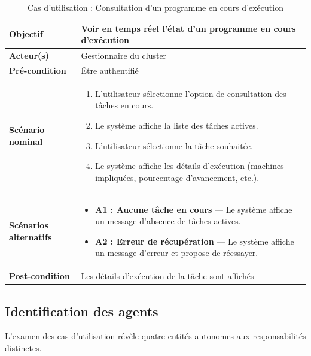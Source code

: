 \documentclass[12pt,a4paper]{report}
\begin{document}
\begin{table}[H]
\centering
\renewcommand{\arraystretch}{1.3}
\begin{tabular}{|p{4cm}|p{11cm}|}
\hline
\textbf{Objectif} & Voir en temps réel l'état d'un programme en cours d'exécution \\
\hline
\textbf{Acteur(s)} & Gestionnaire du cluster \\
\hline
\textbf{Pré-condition} & Être authentifié \\
\hline
\textbf{Scénario nominal} &
\begin{enumerate}
    \item L'utilisateur sélectionne l'option de consultation des tâches en cours.
    \item Le système affiche la liste des tâches actives.
    \item L'utilisateur sélectionne la tâche souhaitée.
    \item Le système affiche les détails d'exécution (machines impliquées, pourcentage d'avancement, etc.).
\end{enumerate} \\
\hline
\textbf{Scénarios alternatifs} &
\begin{itemize}
    \item \textbf{A1 : Aucune tâche en cours} — Le système affiche un message d'absence de tâches actives.
    \item \textbf{A2 : Erreur de récupération} — Le système affiche un message d'erreur et propose de réessayer.
\end{itemize} \\
\hline
\textbf{Post-condition} & Les détails d'exécution de la tâche sont affichés \\
\hline
\end{tabular}
\caption{Cas d'utilisation : Consultation d'un programme en cours d'exécution}
\label{tab:view_program}
\end{table}

\subsection{Identification des agents}

L'examen des cas d'utilisation révèle quatre entités autonomes aux responsabilités distinctes.
\end{document}
